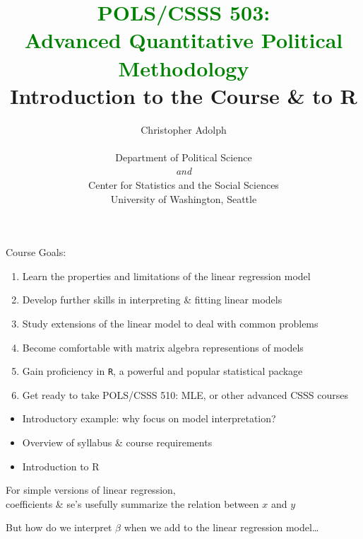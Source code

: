\documentclass[pdflatex,landscape,titlepage]{foils}
\title{{\large \textcolor{green}{POLS/CSSS 503: \\
Advanced Quantitative Political Methodology}} \\
\vspace{.75in}
Introduction to the Course \& to R
\vspace{.5in}
}
\author{\textsf{\large Christopher Adolph}\\\vspace{1 em}\\{ 
\textsf{\small Department of Political Science} \\ \vspace{0.5em} \emph{\textsf{\small and}} \\ \vspace{0.0em} \textsf{\small Center for Statistics and the
Social Sciences} \\ \vspace{0.5em}
  \textsf{\small University of Washington, Seattle}}}
\date{}
\begin{document}

\maketitle
\pagestyle{empty}
\clearpage

\bgclear

Course Goals:

\begin{enumerate}

\item Learn the properties and limitations of the linear regression model

\item Develop further skills in interpreting \& fitting linear models

\item Study extensions of the linear model to deal with common problems

\item Become comfortable with matrix algebra representions of models

\item Gain proficiency in \texttt{R}, a powerful and popular statistical package

\item Get ready to take POLS/CSSS 510: MLE,  or other advanced CSSS courses

\end{enumerate}

\bgclear

\begin{itemize}
\item Introductory example:  why focus on model interpretation?

\item Overview of syllabus \& course requirements

\item Introduction to R
\end{itemize}


\bgclear

For simple versions of linear regression,\\ coefficients \&
se's usefully summarize the relation between $x$ and $y$

But how do we interpret $\beta$ when we add to the linear regression model\ldots
\end{document}
